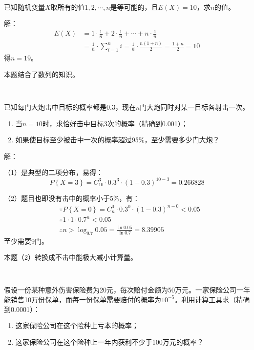 ~

\begin{example}
已知随机变量$X$取所有的值$1,2,\cdots ,n$是等可能的，且$E\left( X \right) =10$，求$n$的值。
\end{example}

解：
\begin{align*}
E\left( X \right) &=1\cdot \frac{1}{n}+2\cdot \frac{1}{n}+\cdots +n\cdot \frac{1}{n} \\
&=\frac{1}{n}\cdot \sum_{i=1}^n{i}=\frac{1}{n}\cdot \frac{n\left( 1+n \right)}{2}=\frac{1+n}{2}=10
\end{align*}
得$n=19$。

\begin{tcolorbox}
本题结合了数列的知识。
\end{tcolorbox}

~

\begin{example}
已知每门大炮击中目标的概率都是0.3，现在$n$门大炮同时对某一目标各射击一次。
\begin{enumerate}
    \item 当$n=10$时，求恰好击中目标3次的概率（精确到0.001）；
    \item 如果使目标至少被击中一次的概率超过95\%，至少需要多少门大炮？
\end{enumerate}
\end{example}

解：

（1）是典型的二项分布，易得：
\[
P\left\{ X=3 \right\} =C_{10}^{3}\cdot 0.3^3\cdot \left( 1-0.3 \right) ^{10-3}=0.266828
\]

（2）题目也即没有击中的概率小于5\%，有：
\begin{align*}
&\because P\left\{ X=0 \right\} =C_{n}^{0}\cdot 0.3^0\cdot \left( 1-0.3 \right) ^{n-0}<0.05 \\
&\therefore 1\cdot 1\cdot 0.7^n<0.05 \\
&\therefore n>\log _{0.7}0.05=\frac{\ln 0.05}{\ln 0.7}=8.39905
\end{align*}
至少需要9门。

\begin{tcolorbox}
本题（2）转换成不击中能极大减小计算量。
\end{tcolorbox}

~

\begin{example}
假设一份某种意外伤害保险费为20元，每次赔付金额为50万元。一家保险公司一年能销售10万份保单，而每一份保单需要赔付的概率为$10^{-5}$。利用计算工具求（精确到0.0001）：
\begin{enumerate}
    \item 这家保险公司在这个险种上亏本的概率；
    \item 这家保险公司在这个险种上一年内获利不少于100万元的概率？
\end{enumerate}
\end{example}


